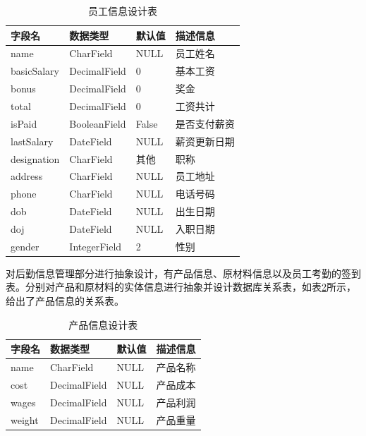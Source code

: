 \begin{table}[H]
    \centering
    \caption{员工信息设计表}
    \label{tab:emp}
    \begin{tabularx}{.85\textwidth}{X<{\centering}X<{\centering}X<{\centering}X<{\centering}}
        \toprule
        字段名 & 数据类型 & 默认值 & 描述信息 \\
        \midrule
        name & CharField & NULL & 员工姓名 \\
        basicSalary & DecimalField & 0 & 基本工资 \\
        bonus & DecimalField & 0 & 奖金 \\
        total & DecimalField & 0 & 工资共计 \\
        isPaid & BooleanField & False & 是否支付薪资 \\
        lastSalary & DateField & NULL & 薪资更新日期 \\
        designation & CharField & 其他 & 职称 \\
        address & CharField & NULL & 员工地址 \\
        phone & CharField & NULL & 电话号码 \\
        dob & DateField & NULL & 出生日期 \\
        doj & DateField & NULL & 入职日期 \\
        gender & IntegerField & 2 & 性别 \\
        \bottomrule
    \end{tabularx}
\end{table}

对后勤信息管理部分进行抽象设计，有产品信息、原材料信息以及员工考勤的签到表。分别对产品和原材料的实体信息进行抽象并设计数据库关系表，如表\ref{tab:product}所示，给出了产品信息的关系表。

\begin{table}[H]
    \centering
    \caption{产品信息设计表}
    \label{tab:product}
    \begin{tabularx}{.85\textwidth}{X<{\centering}X<{\centering}X<{\centering}X<{\centering}}
        \toprule
        字段名 & 数据类型 & 默认值 & 描述信息 \\
        \midrule
        name & CharField & NULL & 产品名称 \\
        cost & DecimalField & NULL & 产品成本 \\
        wages & DecimalField & NULL & 产品利润 \\
        weight & DecimalField & NULL& 产品重量 \\
        \bottomrule
    \end{tabularx}
\end{table}


